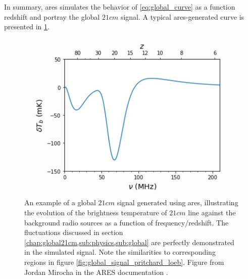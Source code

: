 \documentclass[12pt, TexShade, letterpaper]{report}
\begin{document}
In summary, \gls{ares} simulates the behavior of \ref{eq:global_curve} as a function redshift and portray the global $21cm$ signal. A typical \gls{ares}-generated curve is presented in \ref{fig:ares_Curve}. \par
\begin{figure}[h!]
    \centering
    \includegraphics[scale =0.8]{ares_curve.jpg}
    \caption[Typical global $21cm$ curve generated using \gls{ares}]{An example of a global $21cm$ signal generated using \gls{ares}, illustrating the evolution of the brightness temperature of $21cm$ line against the background radio sources as a function of frequency/redshift. The fluctuations discussed in section \ref{chap:global21cm,sub:physics,sub:global} are perfectly demonstrated in the simulated signal. Note the similarities to corresponding regions in figure \ref{fig:global_signal_pritchard_loeb}. Figure from Jordan Mirocha in the ARES documentation \cite{ares_documentation}.}
    \label{fig:ares_Curve}
\end{figure}
\end{document}
